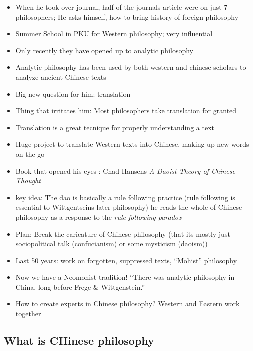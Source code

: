 \documentclass[emulatestandardclasses]{scrartcl}
\begin{document}
\begin{itemize}
  \item When he took over journal, half of the journals article were on just 7 philosophers; He asks himself, how to bring history of foreign philosophy
  \item Summer School in PKU for Western philosophy; very influential
  \item Only recently they have opened up to analytic philosophy
  \item Analytic philosophy has been used by both western and chinese scholars to analyze ancient Chinese texts
  \item Big new question for him: translation
  \item Thing that irritates him: Most philosophers take translation for granted
  \item Translation is a great tecnique for properly understanding a text
  \item Huge project to translate Western texts into Chinese, making up new words on the go
  \item Book that opened his eyes : Chad Hansens  \emph{A Daoist Theory of Chinese Thought}
  \item key idea: The dao is basically a rule following practice (rule following is essential to Wittgentseins later philosophy) he reads the whole of Chinese philosophy as a response to the \emph{rule following paradox}
  \item Plan: Break the caricature of Chinese philosophy (that its mostly just sociopolitical talk (confucianism) or some mysticism (daoism))
  \item Last 50 years: work on forgotten, suppressed texts, "`Mohist"' philosophy
  \item Now we have a Neomohist tradition! "`There was analytic philosophy in China, long before Frege \& Wittgenstein."'
  \item How to create experts in Chinese philosophy? Western and Eastern work together
\end{itemize}


\subsection{What is CHinese philosophy}
\end{document}
